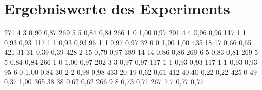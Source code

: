 \chapter{Ergebniswerte des Experiments}\label{anh:ergebnisse}
 \begin{table}[p]
  \centering
  \begin{datatabular}
     {271} {4} {3} {0,90} {0,87}
     {269} {5} {5} {0,84} {0,84}
     {266} {1} {0} {1,00} {0,97}
     {201} {4} {4} {0,96} {0,96}
     {117} {1} {1} {0,93} {0,93}
     {117} {1} {1} {0,93} {0,93}
     {96} {1} {1} {0,97} {0,97}
     {32} {0} {0} {1,00} {1,00}
     {435} {18} {17} {0,66} {0,65}
     {421} {31} {31} {0,39} {0,39}
     {428} {2} {15} {0,79} {0,97}
     {389} {14} {14} {0,86} {0,86}
     {269} {6} {5} {0,83} {0,81}
     {269} {5} {5} {0,84} {0,84}
     {266} {1} {0} {1,00} {0,97}
     {202} {3} {3} {0,97} {0,97}
     {117} {1} {1} {0,93} {0,93}
     {117} {1} {1} {0,93} {0,93}
     {95} {6} {0} {1,00} {0,84}
     {30} {2} {2} {0,98} {0,98}
     {433} {20} {19} {0,62} {0,61}
     {412} {40} {40} {0,22} {0,22}
     {425} {0} {49} {0,37} {1,00}
     {365} {38} {38} {0,62} {0,62}
    {266} {9} {8} {0,73} {0,71}
     {267} {7} {7} {0,77} {0,77}

\end{datatabular}
\end{table}
